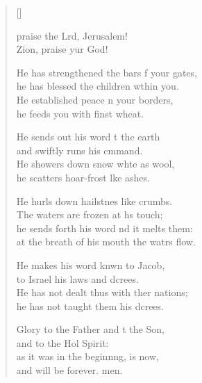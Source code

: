 \settowidth{\versewidth}{He has not dealt thus with other nations.}
\begin{verse}[\versewidth]
  \begin{patverse}
     praise the Lrd, Jerusalem!\Med\\
    Zion, praise yur God!
    
    He has strengthened the bars f your gates,\Med\\
    he has blessed the children w\pointup{\i}thin you.\\
    He established peace n your borders,\Med\\
    he feeds you with finst wheat.
    
    He sends out his word t the earth\Med\\
    and swiftly runs his cmmand.\\
    He showers down snow wh\pointup{\i}te as wool,\Med\\
    he scatters hoar-frost l\pointup{\i}ke ashes.
    
    He hurls down hailstnes like crumbs.\Med\\
    The waters are frozen at h\pointup{\i}s touch;\\
    he sends forth his word nd it melts them:\Med\\
    at the breath of his mouth the watrs flow.
    
    He makes his word knwn to Jacob,\Med\\
    to Israel his laws and dcrees.\\
    He has not dealt thus with ther nations;\Med\\
    he has not taught them his dcrees.
    
    Glory to the Father and t the Son,\Med\\
    and to the Hol Spirit:\\
    as it was in the beginn\pointup{\i}ng, is now,\Med\\
    and will be forever. men.
  \end{patverse}
\end{verse}
